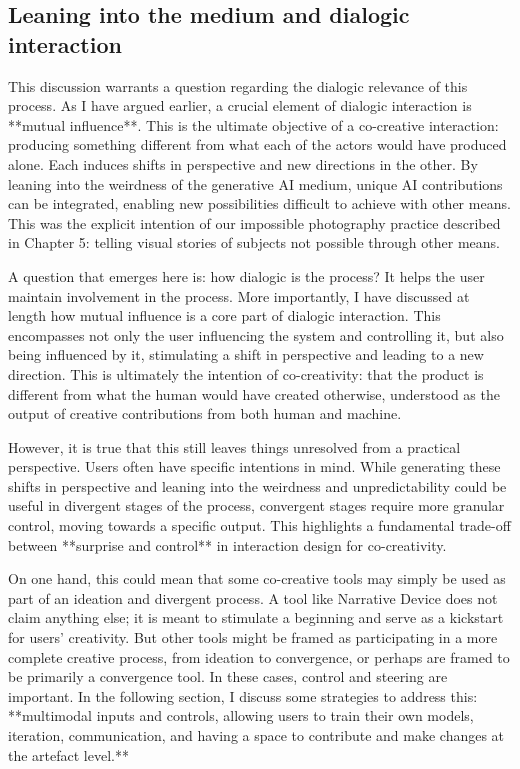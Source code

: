 \subsection{Leaning into the medium and dialogic interaction}

This discussion warrants a question regarding the dialogic relevance of this process. As I have argued earlier, a crucial element of dialogic interaction is **mutual influence**. This is the ultimate objective of a co-creative interaction: producing something different from what each of the actors would have produced alone. Each induces shifts in perspective and new directions in the other. By leaning into the weirdness of the generative AI medium, unique AI contributions can be integrated, enabling new possibilities difficult to achieve with other means. This was the explicit intention of our impossible photography practice described in Chapter 5: telling visual stories of subjects not possible through other means.

A question that emerges here is: how dialogic is the process? It helps the user maintain involvement in the process. More importantly, I have discussed at length how mutual influence is a core part of dialogic interaction. This encompasses not only the user influencing the system and controlling it, but also being influenced by it, stimulating a shift in perspective and leading to a new direction. This is ultimately the intention of co-creativity: that the product is different from what the human would have created otherwise, understood as the output of creative contributions from both human and machine.

However, it is true that this still leaves things unresolved from a practical perspective. Users often have specific intentions in mind. While generating these shifts in perspective and leaning into the weirdness and unpredictability could be useful in divergent stages of the process, convergent stages require more granular control, moving towards a specific output. This highlights a fundamental trade-off between **surprise and control** in interaction design for co-creativity.

On one hand, this could mean that some co-creative tools may simply be used as part of an ideation and divergent process. A tool like Narrative Device does not claim anything else; it is meant to stimulate a beginning and serve as a kickstart for users' creativity. But other tools might be framed as participating in a more complete creative process, from ideation to convergence, or perhaps are framed to be primarily a convergence tool. In these cases, control and steering are important. In the following section, I discuss some strategies to address this: **multimodal inputs and controls, allowing users to train their own models, iteration, communication, and having a space to contribute and make changes at the artefact level.**

